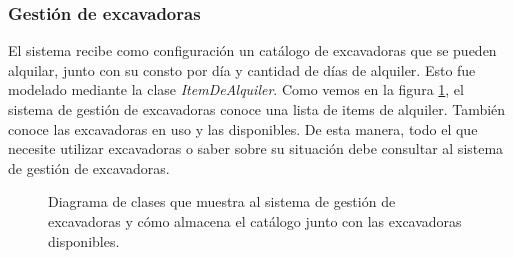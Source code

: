 \newpage


\subsubsection{Gestión de excavadoras}
\par El sistema recibe como configuración un catálogo de excavadoras que se pueden alquilar, junto con su consto por día y cantidad de días de alquiler. Esto fue modelado mediante la clase \textit{ItemDeAlquiler}. Como vemos en la figura \ref{fig:dia_cla_catalogo_1}, el sistema de gestión de excavadoras conoce una lista de items de alquiler. También conoce las excavadoras en uso y las disponibles. De esta manera, todo el que necesite utilizar excavadoras o saber sobre su situación debe consultar al sistema de gestión de excavadoras.

\begin{figure}[ht]
    \caption{Diagrama de clases que muestra al sistema de gestión de excavadoras y cómo almacena el catálogo junto con las excavadoras disponibles.}
    \label{fig:dia_cla_catalogo_1}
\end{figure}

